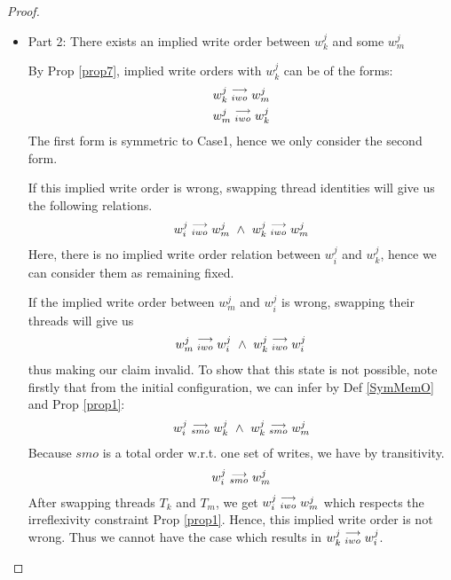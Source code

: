 \begin{proof}
\begin{itemize}
                    \item Part 2: There exists an implied write order between $w_k^j$ and some $w_m^j$
                
                        By Prop \ref{prop7}, implied write orders with $w_k^j$ can be of the forms:
                        \begin{align*}
                            w_k^j\stackrel{\longrightarrow}{_{iwo}}w_m^j \\
                            w_m^j\stackrel{\longrightarrow}{_{iwo}}w_k^j 
                        \end{align*} 
                        The first form is symmetric to Case1, hence we only consider the second form. 

                        If this implied write order is wrong, swapping thread identities will give us the following relations. 
                        \begin{align*}
                            \reln{w_i^j}{iwo}{w_m^j} \ \wedge \ \reln{w_k^j}{iwo}{w_m^j}
                        \end{align*}
                        Here, there is no implied write order relation between $w_i^j$ and $w_k^j$, hence we can consider them as remaining fixed. 

                        If the implied write order between $w_m^j$ and $w_i^j$ is wrong, swapping their threads will give us 
                        \begin{align*}
                            \reln{w_m^j}{iwo}{w_i^j} \ \wedge \ \reln{w_k^j}{iwo}{w_i^j}  
                        \end{align*}
                        thus making our claim invalid. To show that this state is not possible, note firstly that from the initial  configuration,   we    can infer by Def \ref{SymMemO} and Prop \ref{prop1}:
                        \begin{align*}
                            \reln{w_i^j}{smo}{w_k^j} \ \wedge \ \reln{w_k^j}{smo}{w_m^j}
                        \end{align*} 
                        Because $smo$ is a total order w.r.t. one set of writes, we have by transitivity. 
                        \begin{align*}
                            w_i^j\stackrel{\longrightarrow}{_{smo}}w_m^j
                        \end{align*}
                        After swapping threads $T_k$ and $T_m$, we get $w_i^j\stackrel{\longrightarrow}{_{iwo}}w_m^j$ which respects the irreflexivity constraint   Prop  \ref {prop1}. Hence, this implied write order is not wrong. Thus we cannot have the case which results in $w_k^j\stackrel{\longrightarrow}{_{iwo}}w_i^j$.  
                        

\end{itemize}
\end{proof}
